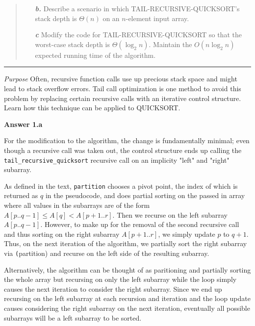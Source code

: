 \documentclass{article}
\begin{document}
\begin{framed}
\begin{quote}
        \begin{enumerate}
            \item[\textbf{\textit{b.}}] Describe a scenario in which 
            TAIL-RECURSIVE-QUICKSORT's stack depth is $\Theta(n)$ on an
            $n$-element input array.
            
            \item[\textbf{\textit{c}}] Modify the code for 
            TAIL-RECURSIVE-QUICKSORT so that the worst-case stack depth is
            $\Theta(\log_{2}n)$. Maintain the $O(n\log_{2}n)$ expected running
            time of the algorithm. 
        \end{enumerate}
    \end{quote}
    
    \rule{\textwidth}{.2pt}
    
    \textit{Purpose} Often, recursive function calls use up precious stack 
    space and might lead to stack overflow errors. Tail call optimization is 
    one method to avoid this problem by replacing certain recursive calls with
    an iterative control structure. Learn how this technique can be applied to
    QUICKSORT.
\end{framed}

\textbf{Answer 1.a}

For the modification to the algorithm, the change is fundamentally minimal; even 
though a recursive call was taken out, the control structure ends up calling the
\texttt{tail\_recursive\_quicksort} recursive call on an implicity "left" and 
"right" subarray. 

As defined in the text, \texttt{partition} chooses a pivot point, the index of 
which is returned as $q$ in the pseudocode, and does partial sorting on the 
passed in array where all values in the subarrays are of the form 
$A[p..q-1] \le A[q] < A[p+1..r]$. Then we recurse on the left subarray 
$A[p..q-1]$. However, to make up for the removal of the second recursive call and
thus sorting on the right subarray $A[p+1..r]$, we simply update $p$ to $q+1$. 
Thus, on the next iteration of the algorithm, we partially sort the right 
subarray via \texttt(partition) and recurse on the left side of the resulting 
subarray. 

Alternatively, the algorithm can be thought of as paritioning and partially 
sorting the whole array but recursing on only the left subarray while the loop
simply causes the next iteration to consider the right subarray. Since we end up
recursing on the left subarray at each recursion and iteration and the loop
update causes considering the right subarray on the next iteration, eventually
all possible subarrays will be a left subarray to be sorted. 
\end{document}
